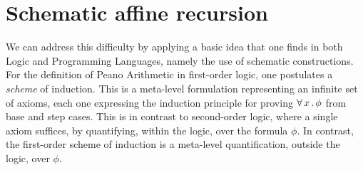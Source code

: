 \documentclass{article}
\begin{document}
\section{Schematic affine recursion}
\label{sec:sar}

We can address this difficulty by applying a basic idea that one finds
in both Logic and Programming Languages, namely the use of schematic
constructions.  For the definition of Peano Arithmetic in first-order
logic, one postulates a \emph{scheme} of induction.  This is a
meta-level formulation representing an infinite set of axioms, each
one expressing the induction principle for proving $\forall\, x\,.\, \phi$
from base and step cases.  This is in contrast to second-order logic,
where a single axiom suffices, by quantifying, within the logic, over
the formula $\phi$.  In contrast, the first-order scheme of induction
is a meta-level quantification, outside the logic, over $\phi$.
\end{document}
